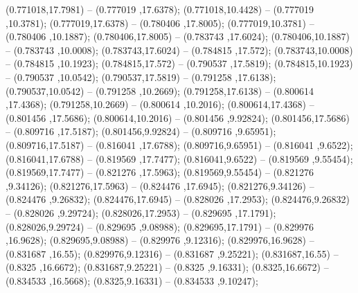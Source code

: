  (0.771018,17.7981) -- (0.777019 ,17.6378);
 (0.771018,10.4428) -- (0.777019 ,10.3781);
 (0.777019,17.6378) -- (0.780406 ,17.8005);
 (0.777019,10.3781) -- (0.780406 ,10.1887);
 (0.780406,17.8005) -- (0.783743 ,17.6024);
 (0.780406,10.1887) -- (0.783743 ,10.0008);
 (0.783743,17.6024) -- (0.784815 ,17.572);
 (0.783743,10.0008) -- (0.784815 ,10.1923);
 (0.784815,17.572) -- (0.790537 ,17.5819);
 (0.784815,10.1923) -- (0.790537 ,10.0542);
 (0.790537,17.5819) -- (0.791258 ,17.6138);
 (0.790537,10.0542) -- (0.791258 ,10.2669);
 (0.791258,17.6138) -- (0.800614 ,17.4368);
 (0.791258,10.2669) -- (0.800614 ,10.2016);
 (0.800614,17.4368) -- (0.801456 ,17.5686);
 (0.800614,10.2016) -- (0.801456 ,9.92824);
 (0.801456,17.5686) -- (0.809716 ,17.5187);
 (0.801456,9.92824) -- (0.809716 ,9.65951);
 (0.809716,17.5187) -- (0.816041 ,17.6788);
 (0.809716,9.65951) -- (0.816041 ,9.6522);
 (0.816041,17.6788) -- (0.819569 ,17.7477);
 (0.816041,9.6522) -- (0.819569 ,9.55454);
 (0.819569,17.7477) -- (0.821276 ,17.5963);
 (0.819569,9.55454) -- (0.821276 ,9.34126);
 (0.821276,17.5963) -- (0.824476 ,17.6945);
 (0.821276,9.34126) -- (0.824476 ,9.26832);
 (0.824476,17.6945) -- (0.828026 ,17.2953);
 (0.824476,9.26832) -- (0.828026 ,9.29724);
 (0.828026,17.2953) -- (0.829695 ,17.1791);
 (0.828026,9.29724) -- (0.829695 ,9.08988);
 (0.829695,17.1791) -- (0.829976 ,16.9628);
 (0.829695,9.08988) -- (0.829976 ,9.12316);
 (0.829976,16.9628) -- (0.831687 ,16.55);
 (0.829976,9.12316) -- (0.831687 ,9.25221);
 (0.831687,16.55) -- (0.8325 ,16.6672);
 (0.831687,9.25221) -- (0.8325 ,9.16331);
 (0.8325,16.6672) -- (0.834533 ,16.5668);
 (0.8325,9.16331) -- (0.834533 ,9.10247);
